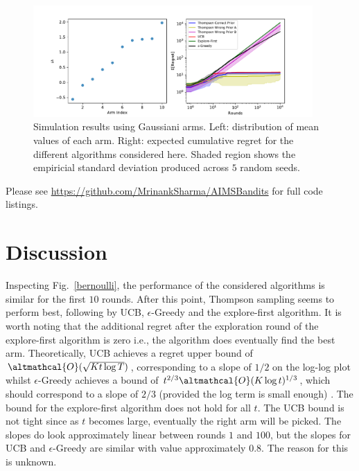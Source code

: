 \documentclass[a4paper]{article}
\begin{document}
	\begin{figure}[H]
		\includegraphics[width=0.95\textwidth]{gaussian}
		\centering
		\caption{\label{gaussian} Simulation results using Gaussiani arms. Left: distribution of mean values of each arm. Right: expected cumulative regret for the different algorithms considered here. Shaded region shows the empiricial standard deviation produced across $5$ random seeds. }
	\end{figure}

	Please see \url{https://github.com/MrinankSharma/AIMSBandits} for full code listings. 

	\section{Discussion}
	Inspecting Fig.~\ref{bernoulli}, the performance of the considered algorithms is similar for the first $10$ rounds. After this point, Thompson sampling seems to perform best, following by UCB, $\epsilon$-Greedy and the explore-first algorithm. It is worth noting that the additional regret after the exploration round of the explore-first algorithm is zero i.e., the algorithm does eventually find the best arm. Theoretically, UCB achieves a regret upper bound of $\altmathcal{O}(\sqrt{Kt \log T})$, corresponding to a slope of $1/2$ on the log-log plot whilst $\epsilon$-Greedy achieves a bound of $t^{2/3} \altmathcal{O}(K \log t)^{1/3}$, which should correspond to a slope of $2/3$ (provided the log term is small enough) \citep{book}. The bound for the explore-first algorithm does not hold for all $t$. The UCB bound is not tight since as $t$ becomes large, eventually the right arm will be picked. The slopes do look approximately linear between rounds $1$ and $100$, but the slopes for UCB and $\epsilon$-Greedy are similar with value approximately $0.8$. The reason for this is unknown.  
	
\end{document}
